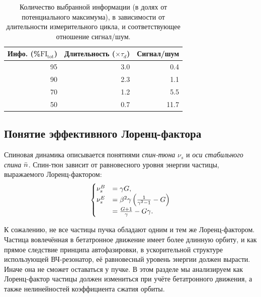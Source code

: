 \begin{table}[h]
	\caption{Количество выбранной информации (в долях от потенциального максимума), в зависимости от длительности измерительного цикла, и соответствующее отношение сигнал/шум.\label{tbl:FItot}}
	
	\centering
	\begin{tabular}{rrr}
		\hline
		Инфо. (\%$\mathrm{FI_{tot}}$) & Длительность ($\times\tau_d$) & Сигнал/шум  \\
		\hline
		95            & 3.0                     & 0.4         \\
		90            & 2.3                     & 1.1         \\
		70            & 1.2                     & 5.5         \\
		50            & 0.7                     & 11.7        \\
		\hline
	\end{tabular}
\end{table}


\subsection{Понятие эффективного Лоренц-фактора}\label{chpt1:FS-methods:effective-Lorentz-factor}
Спиновая динамика описывается понятиями \emph{спин-тюна} $\nu_s$ и \emph{оси стабильного спина} $\bar n$.
Спин-тюн зависит от равновесного уровня энергии частицы, выражаемого Лоренц-фактором:
\begin{equation}\label{eq:spin_tune_vs_gamma}
\begin{cases}
\nu_s^B &= \gamma G, \\
\nu_s^E &= \beta^2\gamma\bkt{\frac{1}{\gamma^2-1} - G} \\
&= \frac{G+1}{\gamma} - G\gamma.
\end{cases}
\end{equation}

К сожалению, не все частицы пучка обладают одним и тем же Лоренц-фактором. Частица вовлечённая в 
бетатронное движение имеет более длинную орбиту, и как прямое следствие принципа автофазировки,
в ускорительной структуре использующей ВЧ-резонатор, её равновесный уровень энергии 
должен вырасти. Иначе она не сможет оставаться у пучке. В этом разделе мы анализируем как Лоренц-фактор частицы
должен измениться при учёте бетатронного движения, а также нелинейностей коэффициента сжатия орбиты.

